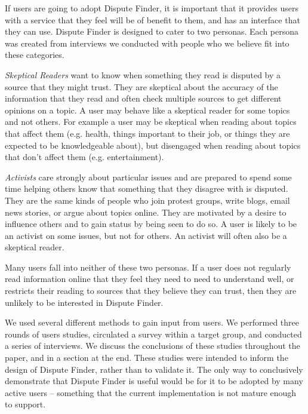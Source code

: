 \documentclass{www2010-submission}
\newcommand{\todo}[1]{}
\begin{document}
If users are going to adopt Dispute Finder, it is important that it provides users with a service that they feel will be of benefit to them, and has an interface that they can use. Dispute Finder is designed to cater to two personas. Each persona was created from interviews we conducted with people who we believe fit into these categories.

{\it Skeptical Readers} want to know when something they read is disputed by a source that they might trust. They are skeptical about the accuracy of the information that they read and often check multiple sources to get different opinions on a topic. A user may behave like a skeptical reader for some topics and not others. For example a user may be skeptical when reading about topics that affect them (e.g. health, things important to their job, or things they are expected to be knowledgeable about), but disengaged when reading about topics that don't affect them (e.g. entertainment).

\todo{Move our personals to a ``people'' section}

\todo{Use interviews to get some actual observations here. These are just fillers.}

{\it Activists} care strongly about particular issues and are prepared to spend some time helping others know that something that they disagree with is disputed. They are the same kinds of people who join protest groups, write blogs, email news stories, or argue about topics online. They are motivated by a desire to influence others and to gain status by being seen to do so. A user is likely to be an activist on some issues, but not for others. An activist will often also be a skeptical reader.

Many users fall into neither of these two personas. If a user does not regularly read information online that they feel they need to need to understand well, or restricts their reading to sources that they believe they can trust, then they are unlikely to be interested in Dispute Finder.

We used several different methods to gain input from users. We performed three rounds of users studies, circulated a survey within a target group, and conducted a series of interviews. We discuss the conclusions of these studies throughout the paper, and in a section at the end. These studies were intended to inform the design of Dispute Finder, rather than to validate it. The only way to conclusively demonstrate that Dispute Finder is useful would be for it to be adopted by many active users -- something that the current implementation is not mature enough to support.
\end{document}
